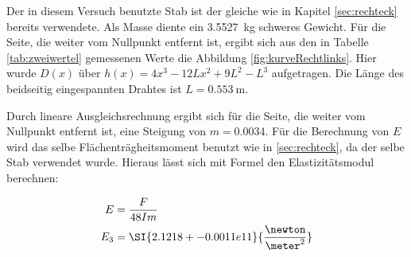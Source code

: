 Der in diesem Versuch benutzte Stab ist der gleiche wie in Kapitel \ref{sec:rechteck} bereits verwendete.
Als Masse diente ein \SI{3.5527}{\kilo\gram} schweres Gewicht. Für die Seite, die weiter vom Nullpunkt entfernt ist, ergibt
sich aus den in Tabelle \ref{tab:zweiwertel} gemessenen Werte
die Abbildung \ref{fig:kurveRechtlinks}. Hier wurde $D(x)$ über $h(x)=4x^3-12Lx^2+9L^2-L^3$ aufgetragen. Die Länge des beidseitig eingespannten Drahtes ist $L=\SI{0.553}{\meter}$.

Durch lineare Ausgleichsrechnung ergibt sich für die Seite, die weiter vom Nullpunkt entfernt ist, eine Steigung von $m=\num{0.0034}$.
Für die Berechnung von $E$ wird das selbe Flächenträgheitsmoment benutzt wie in \ref{sec:rechteck}, da der selbe Stab verwendet wurde.
Hieraus lässt sich mit Formel den Elastizitätsmodul berechnen:

\begin{align*}
  E   &= \frac{F}{48Im} \\
  E_3 &= \SI{2.1218+-0.0011e11}{\frac{\newton}{\meter^2}} \\
\end{align*}

